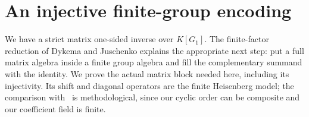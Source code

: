 \section{An injective finite-group encoding}
\label{op:scalar-section}

We have a strict matrix one-sided inverse over $K[G_1]$. The
finite-factor reduction of Dykema and Juschenko
\cite[Lemma~2.1 and Theorem~2.2]{DykemaJuschenko2015} explains the
appropriate next step: put a full matrix algebra inside a finite group
algebra and fill the complementary summand with the identity. We prove
the actual matrix block needed here, including its injectivity. Its
shift and diagonal operators are the finite Heisenberg model; the
comparison with~\cite[Section~1.2]{GurevichHadani2009} is methodological,
since our cyclic order can be composite and our coefficient field is
finite.

